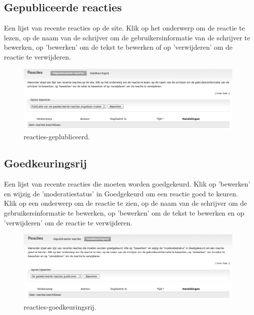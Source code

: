 \subsection{Gepubliceerde reacties} 
Een lijst van recente reacties op de site. Klik op het onderwerp om de reactie
te lezen, op de naam van de schrijver om de gebruikersinformatie van de schrijver
te bewerken, op 'bewerken' om de tekst te bewerken of op 'verwijderen' om de reactie te verwijderen.
\begin{figure}[!h]
    \centering
   \includegraphics[scale=0.3,angle=0]{reacties-geplubliceerd}
   \caption{reacties-geplubliceerd.\label{white}}
 \end{figure}
\subsection{Goedkeuringsrij} 
Een lijst van recente reacties die moeten worden goedgekeurd. Klik op
'bewerken' en wijzig de 'moderatiestatus'  in Goedgekeurd
om een reactie goed te keuren. Klik op een onderwerp om de reactie te zien, op de naam van de schrijver om de gebruikersinformatie
te bewerken, op 'bewerken' om de tekst te bewerken en op 'verwijderen' om de
reactie te verwijderen. \begin{figure}[!h]
    \centering
   \includegraphics[scale=0.3,angle=0]{reacties-goedkeuringsrij}
   \caption{reacties-goedkeuringsrij.\label{white}}
 \end{figure}

